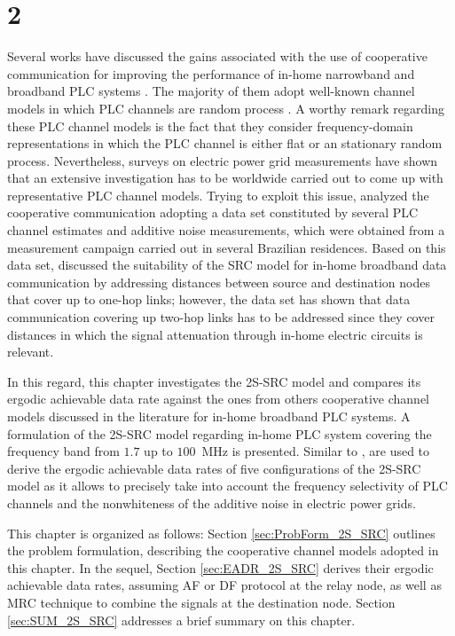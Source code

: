 \chapter{2} \label{TwoStagePLC}

Several works have discussed the gains associated with the use of cooperative communication for improving the performance of in-home narrowband and broadband \ac{PLC} systems \cite{Rubin2016,Dubey2015,Michelle2016}. The majority of them adopt well-known channel models in which \ac{PLC} channels are random process \cite{Rabie2016, Dubey2015, Dubey062015}. A worthy remark regarding these \ac{PLC} channel models is the fact that they consider frequency-domain representations in which the \ac{PLC} channel is either flat or an stationary random process. Nevertheless, surveys on electric power grid measurements have shown that an extensive investigation has to be worldwide carried out to come up with representative \ac{PLC} channel models. Trying to exploit this issue, \cite{Michelle2016} analyzed the cooperative communication adopting a data set constituted by several \ac{PLC} channel estimates and additive noise measurements, which were obtained from a measurement campaign carried out in several Brazilian residences. Based on this data set, \cite{Michelle2016} discussed the suitability of the \ac{SRC} model for in-home broadband data communication by addressing distances between source and destination nodes that cover up to one-hop links; however, the data set has shown that data communication covering up two-hop links has to be addressed since they cover distances in which the signal attenuation through in-home electric circuits is relevant.

In this regard, this chapter investigates the \ac{2S-SRC} model and compares its ergodic achievable data rate against the ones from others cooperative channel models discussed in the literature for in-home broadband \ac{PLC} systems. A formulation of the \ac{2S-SRC} model regarding in-home PLC system covering the frequency band from $1.7$ up to $100$~MHz is presented. Similar to \cite{Michelle2016}, \cite{Goldsmith2001, Choudhuri2014} are used to derive the ergodic achievable data rates of five configurations of the \ac{2S-SRC} model as it allows to precisely take into account the frequency selectivity of \ac{PLC} channels and the nonwhiteness of the additive noise in electric power grids.

This chapter is organized as follows: Section \ref{sec:ProbForm_2S_SRC} outlines the problem formulation, describing the cooperative channel models adopted in this chapter. In the sequel, Section \ref{sec:EADR_2S_SRC} derives their ergodic achievable data rates, assuming \ac{AF} or \ac{DF} protocol at the relay node, as well as \ac{MRC} technique to combine the signals at the destination node. Section \ref{sec:SUM_2S_SRC} addresses a brief summary on this chapter.

